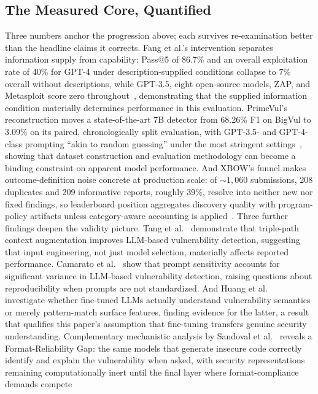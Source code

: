 \documentclass[conference,compsoc]{IEEEtran}
\begin{document}
\subsection{The Measured Core, Quantified}
Three numbers anchor the progression above; each survives re-examination better than the
headline claims it corrects. Fang et al.'s intervention separates information supply from
capability: Pass@5 of 86.7\% and an overall exploitation rate of 40\% for GPT-4 under
description-supplied conditions collapse to 7\% overall without descriptions, while GPT-3.5,
eight open-source models, ZAP, and Metasploit score zero throughout~\cite{fang2024agents}, 
demonstrating that the supplied information condition materially determines performance in
this evaluation. PrimeVul's reconstruction moves a
state-of-the-art 7B detector from 68.26\% F1 on BigVul to 3.09\% on its paired,
chronologically split evaluation, with GPT-3.5- and GPT-4-class prompting ``akin to random
guessing'' under the most stringent settings~\cite{primevul2024}, showing that dataset
construction and evaluation methodology can become a binding constraint on apparent model
performance. And XBOW's funnel makes
outcome-definition noise concrete at production scale: of ${\sim}1{,}060$ submissions, 208
duplicates and 209 informative reports, roughly 39\%, resolve into neither new nor fixed
findings, so leaderboard position aggregates discovery quality with program-policy artifacts
unless category-aware accounting is applied~\cite{xbowtop12025}. Three further findings
deepen the validity picture. Tang et al.~\cite{vultriage2026} demonstrate that triple-path
context augmentation improves LLM-based vulnerability detection, suggesting that input
engineering, not just model selection, materially affects reported performance.
Camarato et al.~\cite{promptaudit2026} show that prompt sensitivity accounts for significant
variance in LLM-based vulnerability detection, raising questions about reproducibility when
prompts are not standardized. And Huang et al.~\cite{semantictrap2026} investigate whether
fine-tuned LLMs actually understand vulnerability semantics or merely pattern-match surface
features, finding evidence for the latter, a result that qualifies this paper's
assumption that fine-tuning transfers genuine security understanding. Complementary
mechanistic analysis by Sandoval et al.~\cite{surgicalrepair2026} reveals a
Format-Reliability Gap: the same models that generate insecure code correctly identify
and explain the vulnerability when asked, with security representations remaining
computationally inert until the final layer where format-compliance demands compete
\end{document}
